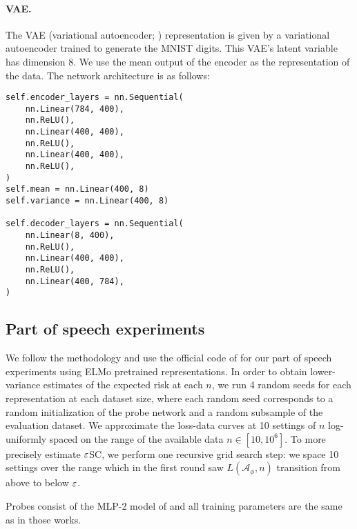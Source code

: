 \paragraph{VAE.}
The VAE (variational autoencoder; \citet{Kingma2014AutoEncodingVB,Rezende2014StochasticBA}) representation is given by a variational autoencoder trained to generate the MNIST digits.
This VAE's latent variable has dimension 8.
We use the mean output of the encoder as the representation of the data.
The network architecture is as follows:
\begin{verbatim}
self.encoder_layers = nn.Sequential(
    nn.Linear(784, 400),
    nn.ReLU(),
    nn.Linear(400, 400),
    nn.ReLU(),
    nn.Linear(400, 400),
    nn.ReLU(),
)
self.mean = nn.Linear(400, 8)
self.variance = nn.Linear(400, 8)

self.decoder_layers = nn.Sequential(
    nn.Linear(8, 400),
    nn.ReLU(),
    nn.Linear(400, 400),
    nn.ReLU(),
    nn.Linear(400, 784),
)
\end{verbatim}

\subsection{Part of speech experiments}

We follow the methodology and use the official code of \citet{Voita2020InformationTheoreticPW} for our part of speech experiments using ELMo \citep{Peters2018DeepCW} pretrained representations.
In order to obtain lower-variance estimates of the expected risk at each $n$, we run 4 random seeds for each representation at each dataset size, where each random seed corresponds to a random initialization of the probe network and a random subsample of the evaluation dataset.
We approximate the loss-data curves at 10 settings of $n$ log-uniformly spaced on the range of the available data $n \in [10, 10^6]$.
To more precisely estimate $\varepsilon$SC, we perform one recursive grid search step: we space 10 settings over the range which in the first round saw $L(\mathcal{A}_\phi, n)$ transition from above to below $\varepsilon$.

Probes consist of the MLP-2 model of \citet{Hewitt2019DesigningProbes,Voita2020InformationTheoreticPW} and all training parameters are the same as in those works.
